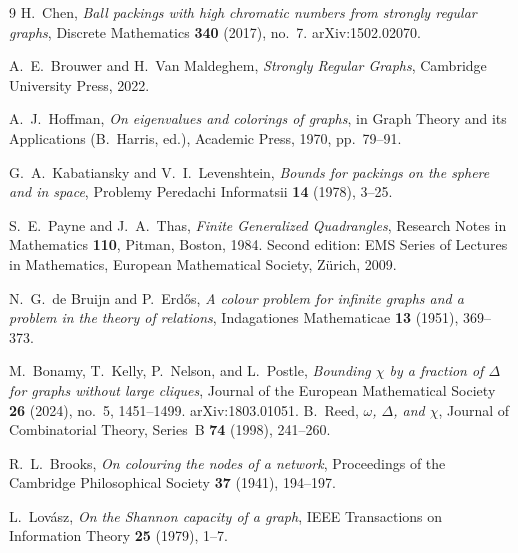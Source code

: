 \documentclass{article}
\theoremstyle{definition}
\begin{document}
\begin{thebibliography}{9}
H.~Chen,
\textit{Ball packings with high chromatic numbers from strongly regular graphs},
Discrete Mathematics \textbf{340} (2017), no.~7.
arXiv:1502.02070.

A.~E.~Brouwer and H.~Van Maldeghem,
\textit{Strongly Regular Graphs},
Cambridge University Press, 2022.

A.~J.~Hoffman,
\textit{On eigenvalues and colorings of graphs},
in Graph Theory and its Applications (B.~Harris, ed.), Academic Press, 1970, pp.\ 79--91.

G.~A.~Kabatiansky and V.~I.~Levenshtein,
\textit{Bounds for packings on the sphere and in space},
Problemy Peredachi Informatsii \textbf{14} (1978), 3--25.

S.~E.~Payne and J.~A.~Thas,
\textit{Finite Generalized Quadrangles},
Research Notes in Mathematics \textbf{110}, Pitman, Boston, 1984.
Second edition: EMS Series of Lectures in Mathematics, European Mathematical Society, Z\"{u}rich, 2009.

N.~G.~de Bruijn and P.~Erd\H{o}s,
\textit{A colour problem for infinite graphs and a problem in the theory of relations},
Indagationes Mathematicae \textbf{13} (1951), 369--373.

M.~Bonamy, T.~Kelly, P.~Nelson, and L.~Postle,
\textit{Bounding $\chi$ by a fraction of $\Delta$ for graphs without large cliques},
Journal of the European Mathematical Society \textbf{26} (2024), no.~5, 1451--1499.
arXiv:1803.01051.
B.~Reed,
\textit{$\omega$, $\Delta$, and $\chi$},
Journal of Combinatorial Theory, Series~B \textbf{74} (1998), 241--260.

R.~L.~Brooks,
\textit{On colouring the nodes of a network},
Proceedings of the Cambridge Philosophical Society \textbf{37} (1941), 194--197.

L.~Lov\'asz,
\textit{On the Shannon capacity of a graph},
IEEE Transactions on Information Theory \textbf{25} (1979), 1--7.

\end{thebibliography}
\end{document}
